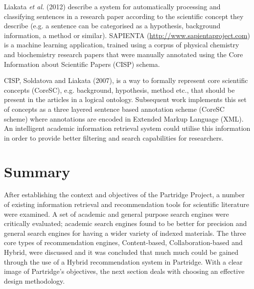 Liakata \emph{et al.} (2012) describe a system for automatically processing and
classifying sentences in a research paper according to the scientific concept
they describe (e.g. a sentence can be categorised as a hypothesis, background
information, a method or similar)\cite{citeulike:10444769}. SAPIENTA
(\url{http://www.sapientaproject.com}) is a machine learning application,
trained using a corpus of physical chemistry and biochemistry research papers
that were manually annotated using the Core Information about Scientific
Papers (CISP)\cite{LIAKATA10.644} schema. 

CISP, Soldatova and Liakata (2007), is a way to formally represent core
scientific concepts (CoreSC), e.g. background, hypothesis, method etc., that
should be present in the articles in a logical
ontology\cite{soldatova2007ontology}. Subsequent work implements this set of
concepts as a three layered sentence based annotation scheme (CoreSC scheme)
where annotations are encoded in Extended Markup Language
(XML)\cite{LIAKATA10.644}. An intelligent academic information retrieval system
could utilise this information in order to provide better filtering and search
capabilities for researchers.


\section{Summary}

After establishing the context and objectives of the Partridge Project, a
number of existing information retrieval and recommendation tools for
scientific literature were examined. A set of academic and general purpose
search engines were critically evaluated; academic search engines found to be
better for precision and general search engines for having a wider variety of
indexed materials. The three core types of recommendation engines,
Content-based, Collaboration-based and Hybrid, were discussed and it was
concluded that much much could be gained through the use of a Hybrid
recommendation system in Partridge. With a clear image of Partridge's
objectives, the next section deals with choosing an effective design
methodology.
